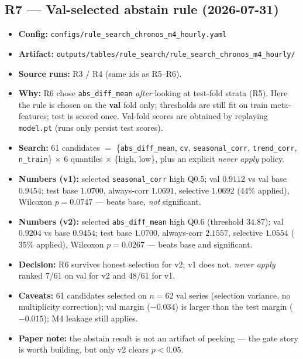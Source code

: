 \subsection*{R7 --- Val-selected abstain rule (2026-07-31)}
\begin{itemize}
  \item \textbf{Config:} \texttt{configs/rule\_search\_chronos\_m4\_hourly.yaml}
  \item \textbf{Artifact:}
        \texttt{outputs/tables/rule\_search/rule\_search\_chronos\_m4\_hourly/}
  \item \textbf{Source runs:} R3 / R4 (same ids as R5--R6).
  \item \textbf{Why:} R6 chose \texttt{abs\_diff\_mean} \emph{after} looking at
        test-fold strata (R5). Here the rule is chosen on the \textbf{val} fold
        only; thresholds are still fit on train meta-features; test is scored once.
        Val-fold scores are obtained by replaying \texttt{model.pt} (runs only
        persist test scores).
  \item \textbf{Search:} 61 candidates $=$ \{\texttt{abs\_diff\_mean},
        \texttt{cv}, \texttt{seasonal\_corr}, \texttt{trend\_corr},
        \texttt{n\_train}\} $\times$ 6 quantiles $\times$ \{high, low\},
        plus an explicit \emph{never apply} policy.
  \item \textbf{Numbers (v1):} selected \texttt{seasonal\_corr} high Q0.5;
        val $0.9112$ vs val base $0.9454$; test base $1.0700$, always-corr
        $1.0691$, selective $\mathbf{1.0692}$ ($44\%$ applied),
        Wilcoxon $p=0.0747$ --- beats base, \emph{not} significant.
  \item \textbf{Numbers (v2):} selected \texttt{abs\_diff\_mean} high Q0.6
        (threshold $34.87$); val $0.9204$ vs base $0.9454$; test base $1.0700$,
        always-corr $2.1557$, selective $\mathbf{1.0554}$ ($35\%$ applied),
        Wilcoxon $p=0.0267$ --- beats base and significant.
  \item \textbf{Decision:} R6 survives honest selection for v2; v1 does not.
        \emph{never apply} ranked 7/61 on val for v2 and 48/61 for v1.
  \item \textbf{Caveats:} 61 candidates selected on $n=62$ val series (selection
        variance, no multiplicity correction); val margin ($-0.034$) is larger
        than the test margin ($-0.015$); M4 leakage still applies.
  \item \textbf{Paper note:} the abstain result is not an artifact of peeking ---
        the gate story is worth building, but only v2 clears $p<0.05$.
\end{itemize}

